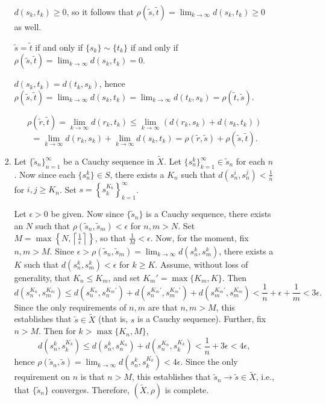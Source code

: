 \documentclass{article}
\begin{document}
\begin{enumerate}
\begin{itemize}
\begin{enumerate}
\(d(s_k,t_k) \geq 0\), so it follows that \(\rho(\tilde{s}, \tilde{t}) = \lim_{k \to \infty} d(s_k,t_k) \geq 0\) as well.

\(\tilde{s} = \tilde{t}\) if and only if \(\{s_k\} \sim \{t_k\}\) if and only if \(\rho(\tilde{s}, \tilde{t}) = \lim_{k \to \infty} d(s_k,t_k) = 0\).

\(d(s_k,t_k) = d(t_k,s_k)\), hence \(\rho(\tilde{s}, \tilde{t}) = \lim_{k \to \infty} d(s_k,t_k) = \lim_{k \to \infty} d(t_k,s_k) = \rho(\tilde{t}, \tilde{s})\).

\[\rho(\tilde{r}, \tilde{t})
  = \lim_{k \to \infty} d(r_k,t_k)
  \leq \lim_{k \to \infty} \left( d(r_k,s_k) + d(s_k,t_k) \right)\]
\[ = \lim_{k \to \infty} d(r_k,s_k) + \lim_{k \to \infty} d(s_k,t_k)
  = \rho(\tilde{r}, \tilde{s}) + \rho(\tilde{s}, \tilde{t}).\]

\item Let \(\{\tilde{s}_n\}_{n = 1}^{\infty}\) be a Cauchy sequence in \(\tilde{X}\).  Let \(\{s_n^k\}_{k = 1}^{\infty} \in \tilde{s}_n\) for each \(n\).  Now since each \(\{s_n^k\} \in S\), there exists a \(K_n\) such that \(d(s_n^i,s_n^j) < \frac{1}{n}\) for \(i,j \geq K_n\).  Set \(s = \left\{ s_k^{K_k} \right\}_{k = 1}^{\infty}\).

Let \(\epsilon > 0\) be given.  Now since \(\{\tilde{s}_n\}\) is a Cauchy sequence, there exists an \(N\) such that \(\rho(\tilde{s}_n, \tilde{s}_m) < \epsilon\) for \(n,m > N\).  Set \(M = \max \left\{ N, \left\lceil \frac{1}{\epsilon} \right\rceil \right\}\), so that \(\frac{1}{M} < \epsilon\).  Now, for the moment, fix \(n,m > M\).  Since \(\epsilon > \rho(\tilde{s}_n, \tilde{s}_m) = \lim_{k \to \infty} d(s_n^k,s_m^k)\), there exists a \(K\) such that \(d(s_n^k,s_m^k) < \epsilon\) for \(k \geq K\).  Assume, without loss of generality, that \(K_n \leq K_m\), and set \(K_m' = \max \{K_m, K\}\).  Then
\[d \left( s_n^{K_n},s_m^{K_m} \right)
  \leq d \left( s_n^{K_n},  s_n^{K_m'} \right)
     + d \left( s_n^{K_m'}, s_m^{K_m'} \right)
     + d \left( s_m^{K_m'}, s_m^{K_m}  \right)
  < \frac{1}{n} + \epsilon + \frac{1}{m}
  < 3 \epsilon.\]
Since the only requirements of \(n,m\) are that \(n,m > M\), this establishes that \(\tilde{s} \in \tilde{X}\) (that is, \(s\) is a Cauchy sequence).  Further, fix \(n > M\).  Then for \(k > \max \{K_n, M\}\),
\[d \left( s_n^k, s_k^{K_k} \right)
  \leq d \left( s_n^k, s_n^{K_n} \right)
     + d \left( s_n^{K_n}, s_k^{K_k} \right)
  < \frac{1}{n} + 3\epsilon
  < 4\epsilon,\]
hence \(\rho(\tilde{s}_n, \tilde{s}) = \lim_{k \to \infty} d \left( s_n^k, s_k^{K_k} \right) < 4\epsilon\).  Since the only requirement on \(n\) is that \(n > M\), this establishes that \(\tilde{s}_n \to \tilde{s} \in \tilde{X}\), i.e., that \(\{\tilde{s}_n\}\) converges.  Therefore, \((\tilde{X}, \rho)\) is complete.


\end{enumerate}
\end{itemize}
\end{enumerate}
\end{document}
